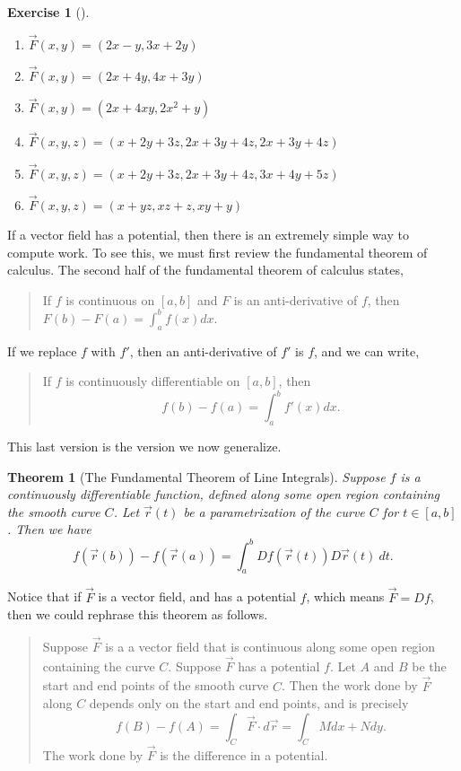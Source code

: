 \documentclass[10pt,]{book}
\theoremstyle{plain}
\newtheorem{theorem}{Theorem}[section]
\theoremstyle{definition}
\theoremstyle{definition}
\theoremstyle{definition}
\theoremstyle{definition}
\newtheorem{exploration}[project]{Exercise}
\theoremstyle{definition}
\numberwithin{equation}{section}
\begin{document}
\begin{exploration}[]\label{exploration-205}
\leavevmode%
\begin{enumerate}[font=\bfseries,label=(\alph*),ref=\alph*]
\item\label{task-524} \(\vec F(x,y)=(2x-y, 3x+2y)\)%
\item\label{task-525} \(\vec F(x,y)=(2x+4y, 4x+3y)\)%
\item\label{task-526} \(\vec F(x,y)=(2x+4xy, 2x^2+y)\)%
\item\label{task-527} \(\vec F(x,y,z)=(x+2y+3z,2x+3y+4z,2x+3y+4z)\)%
\item\label{task-528} \(\vec F(x,y,z)=(x+2y+3z,2x+3y+4z,3x+4y+5z)\)%
\item\label{task-529} \(\vec F(x,y,z)=(x+yz,xz+z,xy+y)\)%
\end{enumerate}
\end{exploration}
If a vector field has a potential, then there is an extremely simple way to compute work. To see this, we must first review the fundamental theorem of calculus. The second half of the fundamental theorem of calculus states,%
\begin{quote}\hypertarget{blockquote-6}{}
If \(f\) is continuous on \([a,b]\) and \(F\) is an anti-derivative of \(f\), then \(F(b)-F(a) = \int_a^b f(x) dx\).\end{quote}
If we replace \(f\) with \(f'\), then an anti-derivative of \(f'\) is \(f\), and we can write,%
\begin{quote}\hypertarget{blockquote-7}{}
If \(f\) is continuously differentiable on \([a,b]\), then%
\begin{equation*}
f(b)-f(a)=\int_a^b f'(x) dx.
\end{equation*}
\end{quote}
This last version is the version we now generalize.%
\begin{theorem}[{The Fundamental Theorem of Line Integrals}]\label{theorem-6}
Suppose \(f\) is a continuously differentiable function, defined along some open region containing the smooth curve \(C\). Let \(\vec r(t)\) be a parametrization of the curve \(C\) for \(t\in[a,b]\). Then we have%
\begin{equation*}
f(\vec r(b))-f(\vec r(a))=\int_a^b Df(\vec r(t))D\vec r(t)\ dt.
\end{equation*}
%
\end{theorem}
Notice that if \(\vec F\) is a vector field, and has a potential \(f\), which means \(\vec F = Df\), then we could rephrase this theorem as follows.%
\begin{quote}\hypertarget{blockquote-8}{}
Suppose \(\vec F\) is a a vector field that is continuous along some open region containing the curve \(C\). Suppose \(\vec F\) has a potential \(f\). Let \(A\) and \(B\) be the start and end points of the smooth curve \(C\).  Then the work done by \(\vec F\) along \(C\) depends only on the start and end points, and is precisely%
\begin{equation*}
f(B)-f(A)=\int_C \vec F\cdot d\vec r = \int_C Mdx+Ndy.
\end{equation*}
The work done by \(\vec F\) is the difference in a potential.\end{quote}
\end{document}
